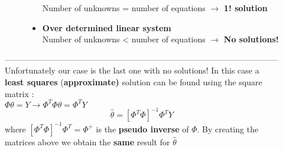 \begin{description}
\begin{description}
\begin{itemize}
Number of unknowns = number of equations $\to$ \textbf{1! solution}
\item \textbf{Over determined linear system}\\
Number of unknowns < number of equations $\to$ \textbf{No solutions!}
\end{itemize}
\end{description}
---------------------------------------------------------------------------------------------------
\\Unfortunately our case is the last one with no solutions! In this case a \textbf{least squares} (\textbf{approximate)} solution can be found using the square matrix  :\\ $ \Phi \theta = Y \to \Phi^T \Phi \theta = \Phi^T Y $
\[
\boxed{ \hat{\theta} = [\Phi^T \Phi]^{-1} \Phi^T Y} 
\]
where $ [\Phi^T \Phi]^{-1} \Phi^T = \Phi^{+} $ is the \textbf{pseudo inverse} of $\Phi$. By creating the matrices above we obtain the \textbf{same} result for 
$\hat{\theta}$
\end{description}
